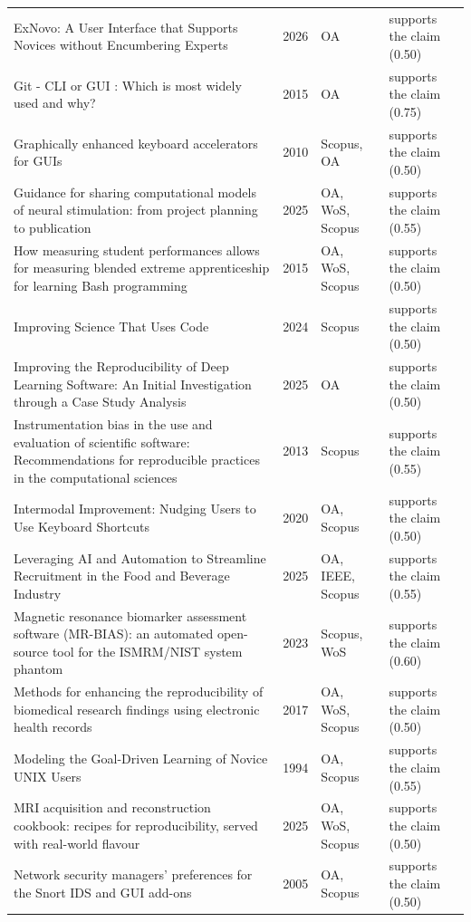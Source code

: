 \begin{longtable}{@{}%
  >{\raggedright\arraybackslash}p{}c%
  >{\raggedright\arraybackslash}p{}%
  >{\raggedright\arraybackslash}p{}@{}}
ExNovo: A User Interface that Supports Novices without Encumbering Experts & 2026 & OA & supports the claim (0.50) \\
Git - CLI or GUI : Which is most widely used and why? & 2015 & OA & supports the claim (0.75) \\
Graphically enhanced keyboard accelerators for GUIs & 2010 & Scopus, OA & supports the claim (0.50) \\
Guidance for sharing computational models of neural stimulation: from project planning to publication & 2025 & OA, WoS, Scopus & supports the claim (0.55) \\
How measuring student performances allows for measuring blended extreme apprenticeship for learning Bash programming & 2015 & OA, WoS, Scopus & supports the claim (0.50) \\
Improving Science That Uses Code & 2024 & Scopus & supports the claim (0.50) \\
Improving the Reproducibility of Deep Learning Software: An Initial Investigation through a Case Study Analysis & 2025 & OA & supports the claim (0.50) \\
Instrumentation bias in the use and evaluation of scientific software: Recommendations for reproducible practices in the computational sciences & 2013 & Scopus & supports the claim (0.55) \\
Intermodal Improvement: Nudging Users to Use Keyboard Shortcuts & 2020 & OA, Scopus & supports the claim (0.50) \\
Leveraging AI and Automation to Streamline Recruitment in the Food and Beverage Industry & 2025 & OA, IEEE, Scopus & supports the claim (0.55) \\
Magnetic resonance biomarker assessment software (MR-BIAS): an automated open-source tool for the ISMRM/NIST system phantom & 2023 & Scopus, WoS & supports the claim (0.60) \\
Methods for enhancing the reproducibility of biomedical research findings using electronic health records & 2017 & OA, WoS, Scopus & supports the claim (0.50) \\
Modeling the Goal-Driven Learning of Novice UNIX Users & 1994 & OA, Scopus & supports the claim (0.55) \\
MRI acquisition and reconstruction cookbook: recipes for reproducibility, served with real-world flavour & 2025 & OA, WoS, Scopus & supports the claim (0.50) \\
Network security managers' preferences for the Snort IDS and GUI add-ons & 2005 & OA, Scopus & supports the claim (0.50) \\

\end{longtable}
